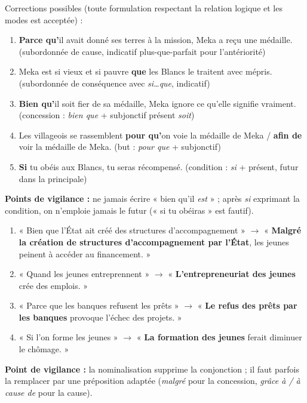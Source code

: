 \documentclass[11pt]{article}
\begin{document}
\begin{corrige}
Corrections possibles (toute formulation respectant la relation logique et les modes est acceptée) :
\begin{enumerate}
\item \textbf{Parce qu'}il avait donné ses terres à la mission, Meka a reçu une médaille. (subordonnée de cause, indicatif plus-que-parfait pour l'antériorité)
\item Meka est si vieux et si pauvre \textbf{que} les Blancs le traitent avec mépris. (subordonnée de conséquence avec \emph{si\ldots que}, indicatif)
\item \textbf{Bien qu'}il soit fier de sa médaille, Meka ignore ce qu'elle signifie vraiment. (concession : \emph{bien que} + subjonctif présent \emph{soit})
\item Les villageois se rassemblent \textbf{pour qu'}on voie la médaille de Meka / \textbf{afin de} voir la médaille de Meka. (but : \emph{pour que} + subjonctif)
\item \textbf{Si} tu obéis aux Blancs, tu seras récompensé. (condition : \emph{si} + présent, futur dans la principale)
\end{enumerate}
\textbf{Points de vigilance :} ne jamais écrire « bien qu'il \emph{est} » ; après \emph{si} exprimant la condition, on n'emploie jamais le futur (« si tu obéiras » est fautif).
\end{corrige}

\begin{corrige}
\begin{enumerate}
\item « Bien que l'État ait créé des structures d'accompagnement » $\rightarrow$ « \textbf{Malgré la création de structures d'accompagnement par l'État}, les jeunes peinent à accéder au financement. »
\item « Quand les jeunes entreprennent » $\rightarrow$ « \textbf{L'entrepreneuriat des jeunes} crée des emplois. »
\item « Parce que les banques refusent les prêts » $\rightarrow$ « \textbf{Le refus des prêts par les banques} provoque l'échec des projets. »
\item « Si l'on forme les jeunes » $\rightarrow$ « \textbf{La formation des jeunes} ferait diminuer le chômage. »
\end{enumerate}
\textbf{Point de vigilance :} la nominalisation supprime la conjonction ; il faut parfois la remplacer par une préposition adaptée (\emph{malgré} pour la concession, \emph{grâce à / à cause de} pour la cause).
\end{corrige}
\end{document}
